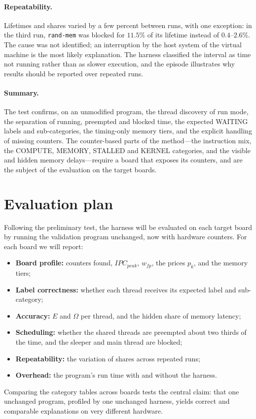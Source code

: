 \documentclass[10pt,a4paper,twocolumn]{article}
\newcommand{\code}[1]{\texttt{\small #1}}
\begin{document}
\paragraph{Repeatability.} Lifetimes and shares varied by a few percent between runs, with one exception: in the third run, \code{rand-mem} was blocked for $11.5\%$ of its lifetime instead of $0.4$--$2.6\%$. The cause was not identified; an interruption by the host system of the virtual machine is the most likely explanation. The harness classified the interval as time not running rather than as slower execution, and the episode illustrates why results should be reported over repeated runs.

\paragraph{Summary.} The test confirms, on an unmodified program, the thread discovery of run mode, the separation of running, preempted and blocked time, the expected WAITING labels and sub-categories, the timing-only memory tiers, and the explicit handling of missing counters. The counter-based parts of the method---the instruction mix, the COMPUTE, MEMORY, STALLED and KERNEL categories, and the visible and hidden memory delays---require a board that exposes its counters, and are the subject of the evaluation on the target boards.

\section{Evaluation plan}
Following the preliminary test, the harness will be evaluated on each target board by running the validation program unchanged, now with hardware counters. For each board we will report:
\begin{itemize}
  \item \textbf{Board profile:} counters found, $IPC_{peak}$, $w_{fp}$, the prices $p_k$, and the memory tiers;
  \item \textbf{Label correctness:} whether each thread receives its expected label and sub-category;
  \item \textbf{Accuracy:} $E$ and $\Omega$ per thread, and the hidden share of memory latency;
  \item \textbf{Scheduling:} whether the shared threads are preempted about two thirds of the time, and the sleeper and main thread are blocked;
  \item \textbf{Repeatability:} the variation of shares across repeated runs;
  \item \textbf{Overhead:} the program's run time with and without the harness.
\end{itemize}
Comparing the category tables across boards tests the central claim: that one unchanged program, profiled by one unchanged harness, yields correct and comparable explanations on very different hardware.
\end{document}
